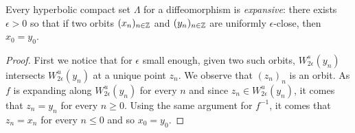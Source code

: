 \documentclass[11pt,openany,leqno]{article}
\begin{document}
\begin{lemm}[Expansiveness]\label{expansiveness}
Every hyperbolic compact set $\Lambda$ for a diffeomorphism is \emph{expansive}: there exists $\epsilon>0$ so that if two orbits $(x_n)_{n\in \mathbb Z}$ and $(y_n)_{n\in \mathbb Z}$ are uniformly $\epsilon$-close, then $x_0=y_0$.
\end{lemm}
\begin{proof}
First we notice that for $\epsilon$ small enough, given two such orbits,  $W^s_{2\epsilon} (y_n)$ intersects $W^u_{2\epsilon} (y_n)$  at a unique point $z_n$. We observe that $(z_n)_n$ is an orbit. As $f$ is expanding along $W^u_{2\epsilon} (y_n)$ for every $n$ and since $z_n\in W^u_{2\epsilon} (y_n)$, it comes that $z_n=y_n$ for every $n\ge 0$. Using the same argument for $f^{-1}$, it comes that $z_n=x_n$  for every $n\le 0$ and so $x_0=y_0$.
\end{proof}
\end{document}
